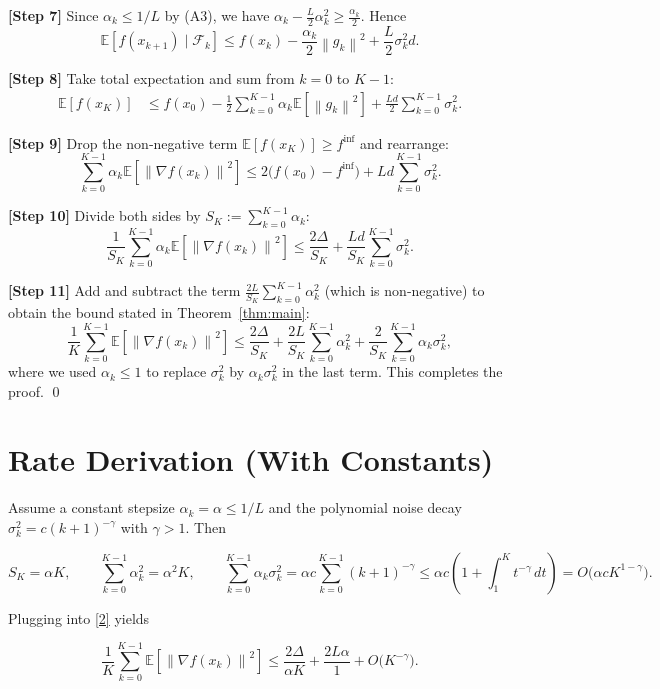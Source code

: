 \documentclass{article}
\newcommand{\E}{\mathbb{E}}
\newcommand{\norm}[1]{\left\|#1\right\|}
\begin{document}
\noindent\textbf{[Step 7]} Since $\alpha_k\le 1/L$ by (A3), we have $\alpha_k-\frac{L}{2}\alpha_k^{2}\ge \frac{\alpha_k}{2}$. Hence
\[
\E\!\left[f(x_{k+1})\mid\mathcal F_k\right]
\le f(x_k)-\frac{\alpha_k}{2}\norm{g_k}^{2}
+\frac{L}{2}\sigma_k^{2}d .
\tag{10}
\]

\noindent\textbf{[Step 8]} Take total expectation and sum from $k=0$ to $K-1$:
\[
\begin{aligned}
\E[f(x_K)] &\le f(x_0)-\frac{1}{2}\sum_{k=0}^{K-1}\alpha_k\E\!\left[\norm{g_k}^{2}\right]
+\frac{L d}{2}\sum_{k=0}^{K-1}\sigma_k^{2}.
\end{aligned}
\tag{11}
\]

\noindent\textbf{[Step 9]} Drop the non‑negative term $\E[f(x_K)]\ge f^{\inf}$ and rearrange:
\[
\sum_{k=0}^{K-1}\alpha_k\E\!\left[\norm{\nabla f(x_k)}^{2}\right]
\le 2\bigl(f(x_0)-f^{\inf}\bigr)
+L d\sum_{k=0}^{K-1}\sigma_k^{2}.
\tag{12}
\]

\noindent\textbf{[Step 10]} Divide both sides by $S_K:=\sum_{k=0}^{K-1}\alpha_k$:
\[
\frac{1}{S_K}\sum_{k=0}^{K-1}\alpha_k\E\!\left[\norm{\nabla f(x_k)}^{2}\right]
\le
\frac{2\Delta}{S_K}
+\frac{L d}{S_K}\sum_{k=0}^{K-1}\sigma_k^{2}.
\tag{13}
\]

\noindent\textbf{[Step 11]} Add and subtract the term $\frac{2L}{S_K}\sum_{k=0}^{K-1}\alpha_k^{2}$ (which is non‑negative) to obtain the bound stated in Theorem~\ref{thm:main}:
\[
\frac{1}{K}\sum_{k=0}^{K-1}\E\!\left[\norm{\nabla f(x_k)}^{2}\right]
\le
\frac{2\Delta}{S_K}
+\frac{2L}{S_K}\sum_{k=0}^{K-1}\alpha_k^{2}
+\frac{2}{S_K}\sum_{k=0}^{K-1}\alpha_k\sigma_k^{2},
\]
where we used $\alpha_k\le 1$ to replace $\sigma_k^{2}$ by $\alpha_k\sigma_k^{2}$ in the last term. This completes the proof. \qed

\section*{Rate Derivation (With Constants)}
Assume a constant stepsize $\alpha_k=\alpha\le 1/L$ and the polynomial noise decay $\sigma_k^{2}=c(k+1)^{-\gamma}$ with $\gamma>1$. Then

\[
S_K = \alpha K,\qquad
\sum_{k=0}^{K-1}\alpha_k^{2}= \alpha^{2}K,\qquad
\sum_{k=0}^{K-1}\alpha_k\sigma_k^{2}
= \alpha c\sum_{k=0}^{K-1}(k+1)^{-\gamma}
\le \alpha c\!\left(1+\int_{1}^{K}t^{-\gamma}\,dt\right)
= O\!\bigl(\alpha cK^{1-\gamma}\bigr).
\]

Plugging into \eqref{2} yields

\[
\frac{1}{K}\sum_{k=0}^{K-1}\E\!\left[\norm{\nabla f(x_k)}^{2}\right]
\le
\frac{2\Delta}{\alpha K}
+ \frac{2L\alpha}{1}
+ O\!\bigl(K^{-\gamma}\bigr).
\]
\end{document}
